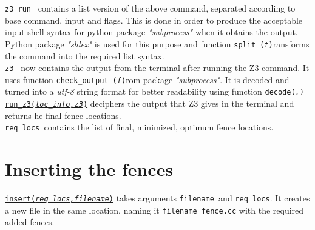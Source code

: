 \documentclass{article}
\newcommand{\var}[1]{\color{OliveGreen} \texttt{#1}\color{black}}
\newcommand{\fun}[2]{\color{Sepia}\texttt{#1(\color{Gray}\textit{#2}\color{Sepia})}\color{black}}
\begin{document}
\var{z3\_run } contains a list version of the above command, separated according to base command, input and flags. This is done in order to produce the acceptable input shell syntax for python package \textit{"subprocess"} when it obtains the output. Python package \textit{"shlex"} is used for this purpose and function \fun{split } transforms the command into the required list syntax.\\

\var{z3 } now contains the output from the terminal after running the Z3 command. It uses function \fun{check\_output }from package \textit{"subprocess"}. It is decoded and turned into a \textit{utf-8} string format for better readability using function \fun{decode}.\\

\href{runz3.tex}{\fun{run\_z3}{loc\_info,z3}} deciphers the output that Z3 gives in the terminal and returns he final fence locations.\\

\var{req\_locs }contains the list of final, minimized, optimum fence locations.\\

\section{Inserting the fences}
\par
\href{insert.tex}{\fun{insert}{req\_locs,filename}} takes arguments \var{filename }and \var{req\_locs}. It creates a new file in the same location, naming it \texttt{filename\_fence.cc} with the required added fences.
\end{document}
